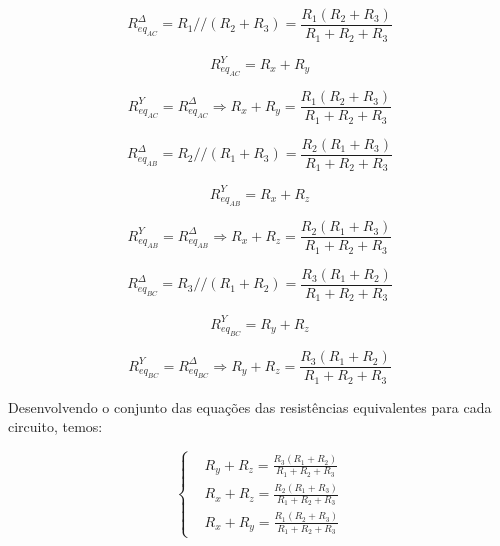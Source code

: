 \documentclass[12pt,fleqn]{book} %
\begin{document}
\begin{equation}
R_{{eq}_{AC}}^{\Delta}=R_1//(R_2+R_3)=\frac{R_1 (R_2+R_3)}{R_1+R_2+R_3}
\end{equation}   

\begin{equation}
R_{{eq}_{AC}}^Y=R_x+R_y
\end{equation}  

\begin{equation}
R_{{eq}_{AC}}^Y=R_{{eq}_{AC}}^\Delta \Rightarrow R_x+R_y =\frac{R_1 (R_2+R_3)}{R_1+R_2+R_3}
\end{equation}   
        
\begin{equation}
R_{{eq}_{AB}}^{\Delta}=R_2//(R_1+R_3)=\frac{R_2 (R_1+R_3)}{R_1+R_2+R_3}
\end{equation}   

\begin{equation}
R_{{eq}_{AB}}^Y=R_x+R_z
\end{equation}  

\begin{equation}
R_{{eq}_{AB}}^Y=R_{{eq}_{AB}}^\Delta \Rightarrow R_x+R_z =\frac{R_2 (R_1+R_3)}{R_1+R_2+R_3}
\end{equation}

\begin{equation}
R_{{eq}_{BC}}^{\Delta}=R_3//(R_1+R_2)=\frac{R_3 (R_1+R_2)}{R_1+R_2+R_3}
\end{equation}   

\begin{equation}
R_{{eq}_{BC}}^Y=R_y+R_z
\end{equation}  

\begin{equation}
R_{{eq}_{BC}}^Y=R_{{eq}_{BC}}^\Delta \Rightarrow R_y+R_z =\frac{R_3 (R_1+R_2)}{R_1+R_2+R_3}
\end{equation}   

Desenvolvendo o conjunto das equações das resistências equivalentes para cada circuito, temos:

\begin{equation}\label{sistemaNo}
    \left\{\begin{aligned} & 
          R_y+R_z=\frac{R_3 (R_1+R_2)}{R_1+R_2+R_3}\\& 
          R_x+R_z=\frac{R_2 (R_1+R_3)}{R_1+R_2+R_3}\\&
          R_x+R_y=\frac{R_1 (R_2+R_3)}{R_1+R_2+R_3}
    \end{aligned}\right.
    \end{equation}
        
\end{document}
